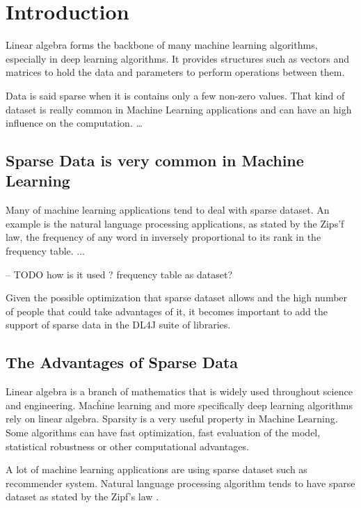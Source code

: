 \chapter{Introduction}


Linear algebra forms the backbone of many machine learning algorithms, especially in deep learning algorithms. It provides structures such as vectors and matrices to hold the data and parameters to perform operations between them. 

Data is said sparse when it is contains only a few non-zero values. That kind of dataset is really common in Machine Learning applications and can have an high influence on the computation. \dots

\section{Sparse Data is very common in Machine Learning}

Many of machine learning applications tend to deal with sparse dataset. An example is the natural language processing applications, as stated by the Zips'f law, the frequency of any word in inversely proportional to its rank in the frequency table. ... 

-- TODO how is it used ? frequency table as dataset?


Given the possible optimization that sparse dataset allows and the high number of people that could take advantages of it, it becomes important to add the support of sparse data in the DL4J suite of libraries. 



\section{The Advantages of Sparse Data}
Linear algebra is a branch of mathematics that is widely used throughout science and engineering. Macĥine learning and more specifically deep learning algorithms rely on linear algebra. Sparsity is a very useful property in Machine Learning. Some algorithms can have fast optimization, fast evaluation of the model, statistical robustness or other computational advantages.

A lot of machine learning applications are using sparse dataset such as recommender system. Natural language processing algorithm tends to have sparse dataset as stated by the Zipf's law \cite{Zipf}.



